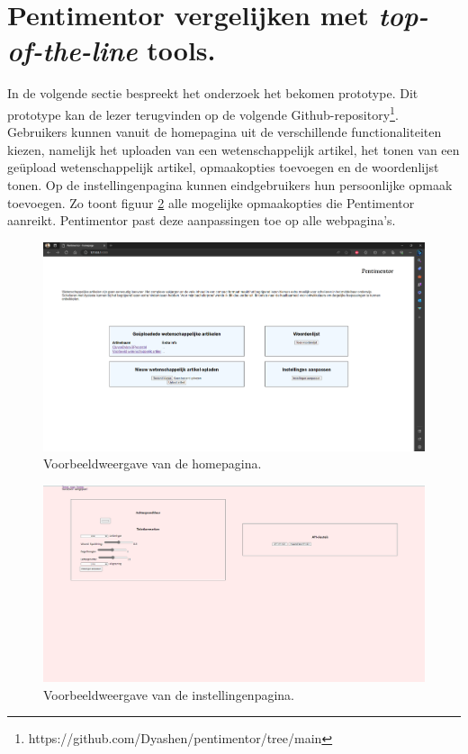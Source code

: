 \section{Pentimentor vergelijken met \textit{top-of-the-line} tools.}

In de volgende sectie bespreekt het onderzoek het bekomen prototype. Dit prototype kan de lezer terugvinden op de volgende Github-repository\footnote{https://github.com/Dyashen/pentimentor/tree/main}. Gebruikers kunnen vanuit de homepagina uit de verschillende functionaliteiten kiezen, namelijk het uploaden van een wetenschappelijk artikel, het tonen van een geüpload wetenschappelijk artikel, opmaakopties toevoegen en de woordenlijst tonen. Op de instellingenpagina kunnen eindgebruikers hun persoonlijke opmaak toevoegen. Zo toont figuur \ref{img:website-instellingen} alle mogelijke opmaakopties die Pentimentor aanreikt. Pentimentor past deze aanpassingen toe op alle webpagina's.

\begin{center}
	\begin{figure}[H]
		\includegraphics[width=\linewidth]{img/homepagina.png}
		\caption{Voorbeeldweergave van de homepagina.}
		\label{img:homepagina}
	\end{figure}
\end{center}

\begin{center}
    \begin{figure}[H]
        \includegraphics[width=\linewidth]{img/website-instellingen.png}
        \caption{Voorbeeldweergave van de instellingenpagina.}
        \label{img:website-instellingen}
    \end{figure}
\end{center}

